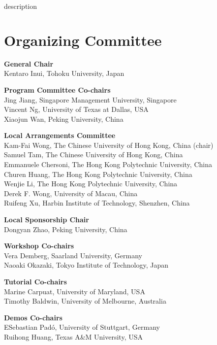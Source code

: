 description\markboth{}{} %
\markright{}{} %

\section{Organizing Committee}

\setlength{\parindent}{0pt}

{\bf General Chair} \\
Kentaro Inui, Tohoku University, Japan       


{\bf Program Committee Co-chairs} \\
Jing Jiang, Singapore Management University, Singapore \\
Vincent Ng, University of Texas at Dallas, USA \\
Xiaojun Wan, Peking University, China

{\bf Local Arrangements Committee} \\
Kam-Fai Wong, The Chinese University of Hong Kong, China (chair) \\
Samuel Tam, The Chinese University of Hong Kong, China \\
Emmanuele Chersoni, The Hong Kong Polytechnic University, China \\
Churen Huang, The Hong Kong Polytechnic University, China \\
Wenjie Li, The Hong Kong Polytechnic University, China \\
Derek F. Wong, University of Macau, China \\
Ruifeng Xu, Harbin Institute of Technology, Shenzhen, China

{\bf Local Sponsorship Chair} \\
Dongyan Zhao, Peking University, China
        

{\bf Workshop Co-chairs} \\
Vera Demberg, Saarland University, Germany \\
Naoaki Okazaki, Tokyo Institute of Technology, Japan


{\bf Tutorial Co-chairs} \\
Marine Carpuat, University of Maryland, USA \\
Timothy Baldwin, University of Melbourne, Australia

{\bf Demos Co-chairs} \\
ESebastian Pad\'o, University of Stuttgart, Germany \\
Ruihong Huang, Texas A\&M University, USA
 

